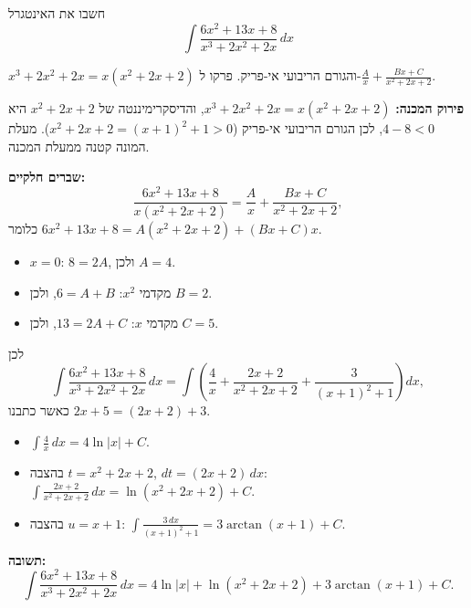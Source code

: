
\begin{question}
חשבו את האינטגרל
\[ \int \frac{6x^2 + 13x + 8}{x^3 + 2x^2 + 2x}\,dx \]
\end{question}

\begin{hint}
$x^3 + 2x^2 + 2x = x(x^2 + 2x + 2)$ והגורם הריבועי אי-פריק. פרקו ל-$\frac{A}{x} + \frac{Bx + C}{x^2 + 2x + 2}$.
\end{hint}

\begin{solution}
\textbf{פירוק המכנה:} $x^3 + 2x^2 + 2x = x(x^2 + 2x + 2)$, והדיסקרימיננטה של $x^2 + 2x + 2$ היא $4 - 8 < 0$, לכן הגורם הריבועי אי-פריק ($x^2 + 2x + 2 = (x + 1)^2 + 1 > 0$). מעלת המונה קטנה ממעלת המכנה.

\textbf{שברים חלקיים:}
\[ \frac{6x^2 + 13x + 8}{x(x^2 + 2x + 2)} = \frac{A}{x} + \frac{Bx + C}{x^2 + 2x + 2}, \]
כלומר $6x^2 + 13x + 8 = A(x^2 + 2x + 2) + (Bx + C)x$.
\begin{itemize}
  \item $x = 0$: $8 = 2A$, ולכן $A = 4$.
  \item מקדמי $x^2$: $6 = A + B$, ולכן $B = 2$.
  \item מקדמי $x$: $13 = 2A + C$, ולכן $C = 5$.
\end{itemize}
לכן
\[ \int \frac{6x^2 + 13x + 8}{x^3 + 2x^2 + 2x}\,dx = \int \left( \frac4x + \frac{2x + 2}{x^2 + 2x + 2} + \frac{3}{(x + 1)^2 + 1} \right) dx, \]
כאשר כתבנו $2x + 5 = (2x + 2) + 3$.
\begin{itemize}
  \item $\int \frac4x\,dx = 4\ln|x| + C$.
  \item בהצבה $t = x^2 + 2x + 2$, $dt = (2x + 2)\,dx$: $\int \frac{2x + 2}{x^2 + 2x + 2}\,dx = \ln(x^2 + 2x + 2) + C$.
  \item בהצבה $u = x + 1$: $\int \frac{3\,dx}{(x + 1)^2 + 1} = 3\arctan(x + 1) + C$.
\end{itemize}
\textbf{תשובה:}
\[ \boxed{\int \frac{6x^2 + 13x + 8}{x^3 + 2x^2 + 2x}\,dx = 4\ln|x| + \ln(x^2 + 2x + 2) + 3\arctan(x + 1) + C.} \]
\end{solution}
